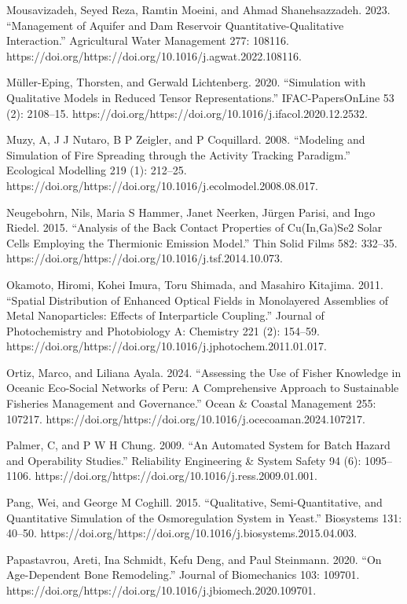 \documentclass[utf8]{gradu3}
\begin{document}
Mousavizadeh, Seyed Reza, Ramtin Moeini, and Ahmad Shanehsazzadeh. 2023. “Management of Aquifer and Dam Reservoir Quantitative-Qualitative Interaction.” Agricultural Water Management 277: 108116. https://doi.org/https://doi.org/10.1016/j.agwat.2022.108116.

Müller-Eping, Thorsten, and Gerwald Lichtenberg. 2020. “Simulation with Qualitative Models in Reduced Tensor Representations.” IFAC-PapersOnLine 53 (2): 2108–15. https://doi.org/https://doi.org/10.1016/j.ifacol.2020.12.2532.

Muzy, A, J J Nutaro, B P Zeigler, and P Coquillard. 2008. “Modeling and Simulation of Fire Spreading through the Activity Tracking Paradigm.” Ecological Modelling 219 (1): 212–25. https://doi.org/https://doi.org/10.1016/j.ecolmodel.2008.08.017.

Neugebohrn, Nils, Maria S Hammer, Janet Neerken, Jürgen Parisi, and Ingo Riedel. 2015. “Analysis of the Back Contact Properties of Cu(In,Ga)Se2 Solar Cells Employing the Thermionic Emission Model.” Thin Solid Films 582: 332–35. https://doi.org/https://doi.org/10.1016/j.tsf.2014.10.073.

Okamoto, Hiromi, Kohei Imura, Toru Shimada, and Masahiro Kitajima. 2011. “Spatial Distribution of Enhanced Optical Fields in Monolayered Assemblies of Metal Nanoparticles: Effects of Interparticle Coupling.” Journal of Photochemistry and Photobiology A: Chemistry 221 (2): 154–59. https://doi.org/https://doi.org/10.1016/j.jphotochem.2011.01.017.

Ortiz, Marco, and Liliana Ayala. 2024. “Assessing the Use of Fisher Knowledge in Oceanic Eco-Social Networks of Peru: 
A Comprehensive Approach to Sustainable Fisheries Management and Governance.” Ocean \& Coastal Management 255: 107217. https://doi.org/https://doi.org/10.1016/j.ocecoaman.2024.107217.

Palmer, C, and P W H Chung. 2009. “An Automated System for Batch Hazard and Operability Studies.” Reliability Engineering \& System Safety 94 (6): 1095–1106. https://doi.org/https://doi.org/10.1016/j.ress.2009.01.001.

Pang, Wei, and George M Coghill. 2015. “Qualitative, Semi-Quantitative, and Quantitative Simulation of the Osmoregulation System in Yeast.” Biosystems 131: 40–50. https://doi.org/https://doi.org/10.1016/j.biosystems.2015.04.003.

Papastavrou, Areti, Ina Schmidt, Kefu Deng, and Paul Steinmann. 2020. “On Age-Dependent Bone Remodeling.” Journal of Biomechanics 103: 109701. https://doi.org/https://doi.org/10.1016/j.jbiomech.2020.109701.
\end{document}
